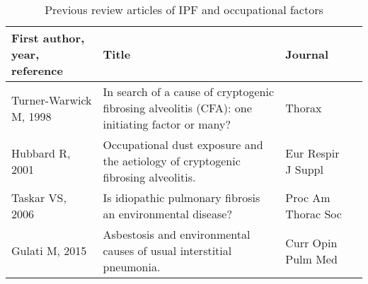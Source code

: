 \documentclass[a4
er,12pt]{article}
\begin{document}
\begin{table}
    \begin{tabular}{lp{6cm}ll}
 	             \textbf{First author, year, reference} &                                                                                  \textbf{Title} &           \textbf{Journal} \\
    \midrule
        Turner-Warwick M, 1998\cite{Turner-Warwick1998} &  In search of a cause of cryptogenic fibrosing alveolitis (CFA): one initiating factor or many? &              Thorax \\
                      Hubbard R, 2001\cite{Hubbard2001} &               Occupational dust exposure and the aetiology of cryptogenic fibrosing alveolitis. &  Eur Respir J Suppl \\
                       Taskar VS, 2006\cite{Taskar2006} &                                      Is idiopathic pulmonary fibrosis an environmental disease? &  Proc Am Thorac Soc \\
                        Gulati M, 2015\cite{Gulati2015} &                            Asbestosis and environmental causes of usual interstitial pneumonia. &  Curr Opin Pulm Med \\
    \bottomrule
    \end{tabular}
    \caption{Previous review articles of IPF and occupational factors}
    \label{table:reviews}
\end{table}
\end{document}
